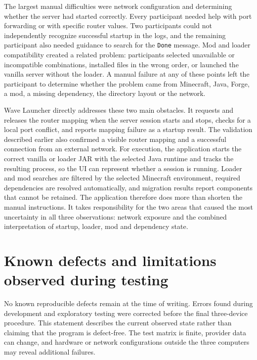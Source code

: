 The largest manual difficulties were network configuration and determining whether the server had started correctly. Every participant needed help with port forwarding or with specific router values. Two participants could not independently recognize successful startup in the logs, and the remaining participant also needed guidance to search for the \texttt{Done} message. Mod and loader compatibility created a related problem: participants selected unavailable or incompatible combinations, installed files in the wrong order, or launched the vanilla server without the loader. A manual failure at any of these points left the participant to determine whether the problem came from Minecraft, Java, Forge, a mod, a missing dependency, the directory layout or the network.

Wave Launcher directly addresses these two main obstacles. It requests and releases the router mapping when the server session starts and stops, checks for a local port conflict, and reports mapping failure as a startup result. The validation described earlier also confirmed a visible router mapping and a successful connection from an external network. For execution, the application starts the correct vanilla or loader JAR with the selected Java runtime and tracks the resulting process, so the UI can represent whether a session is running. Loader and mod searches are filtered by the selected Minecraft environment, required dependencies are resolved automatically, and migration results report components that cannot be retained. The application therefore does more than shorten the manual instructions. It takes responsibility for the two areas that caused the most uncertainty in all three observations: network exposure and the combined interpretation of startup, loader, mod and dependency state.

\section{Known defects and limitations observed during testing}

No known reproducible defects remain at the time of writing. Errors found during development and exploratory testing were corrected before the final three-device procedure. This statement describes the current observed state rather than claiming that the program is defect-free. The test matrix is finite, provider data can change, and hardware or network configurations outside the three computers may reveal additional failures.

